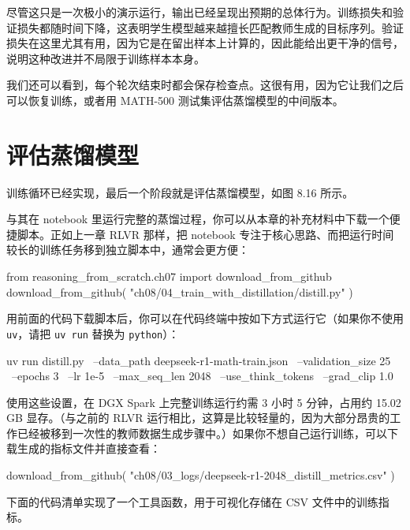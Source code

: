 尽管这只是一次极小的演示运行，输出已经呈现出预期的总体行为。训练损失和验证损失都随时间下降，这表明学生模型越来越擅长匹配教师生成的目标序列。验证损失在这里尤其有用，因为它是在留出样本上计算的，因此能给出更干净的信号，说明这种改进并不局限于训练样本本身。

我们还可以看到，每个轮次结束时都会保存检查点。这很有用，因为它让我们之后可以恢复训练，或者用 MATH-500 测试集评估蒸馏模型的中间版本。

\section{评估蒸馏模型}

训练循环已经实现，最后一个阶段就是评估蒸馏模型，如图 8.16 所示。


与其在 notebook 里运行完整的蒸馏过程，你可以从本章的补充材料中下载一个便捷脚本。正如上一章 RLVR 那样，把 notebook 专注于核心思路、而把运行时间较长的训练任务移到独立脚本中，通常会更方便：

\begin{codebox}
from reasoning_from_scratch.ch07 import download_from_github
download_from_github(
    "ch08/04_train_with_distillation/distill.py"
)
\end{codebox}

用前面的代码下载脚本后，你可以在代码终端中按如下方式运行它（如果你不使用 \texttt{uv}，请把 \texttt{uv run} 替换为 \texttt{python}）：

\begin{codebox}
uv run distill.py \
--data_path deepseek-r1-math-train.json \
--validation_size 25 \
--epochs 3 \
--lr 1e-5 \
--max_seq_len 2048 \
--use_think_tokens \
--grad_clip 1.0
\end{codebox}

使用这些设置，在 DGX Spark 上完整训练运行约需 3 小时 5 分钟，占用约 15.02 GB 显存。（与之前的 RLVR 运行相比，这算是比较轻量的，因为大部分昂贵的工作已经被移到一次性的教师数据生成步骤中。）如果你不想自己运行训练，可以下载生成的指标文件并直接查看：

\begin{codebox}
download_from_github(
    "ch08/03_logs/deepseek-r1-2048_distill_metrics.csv"
)
\end{codebox}

下面的代码清单实现了一个工具函数，用于可视化存储在 CSV 文件中的训练指标。

